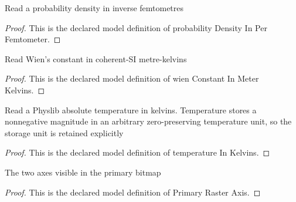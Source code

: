 \begin{definition}
  \label{def:physics:phyx-mini-0646:phyxminiproblems-problemphyxmini0646-probabilitydensityinperfemtometer}
  Read a probability density in inverse femtometres
\end{definition}
\begin{proof}
  This is the declared model definition of probability Density In Per Femtometer.
\end{proof}
\begin{definition}
  \label{def:physics:phyx-mini-0646:phyxminiproblems-problemphyxmini0646-wienconstantinmeterkelvins}
  Read Wien's constant in coherent-SI metre-kelvins
\end{definition}
\begin{proof}
  This is the declared model definition of wien Constant In Meter Kelvins.
\end{proof}
\begin{definition}
  \label{def:physics:phyx-mini-0646:phyxminiproblems-problemphyxmini0646-temperatureinkelvins}
  Read a Physlib absolute temperature in kelvins. Temperature stores a nonnegative magnitude in an arbitrary zero-preserving temperature unit, so the storage unit is retained explicitly
\end{definition}
\begin{proof}
  This is the declared model definition of temperature In Kelvins.
\end{proof}
\begin{definition}
  \label{def:physics:phyx-mini-0646:phyxminiproblems-problemphyxmini0646-primaryrasteraxis}
  The two axes visible in the primary bitmap
\end{definition}
\begin{proof}
  This is the declared model definition of Primary Raster Axis.
\end{proof}
